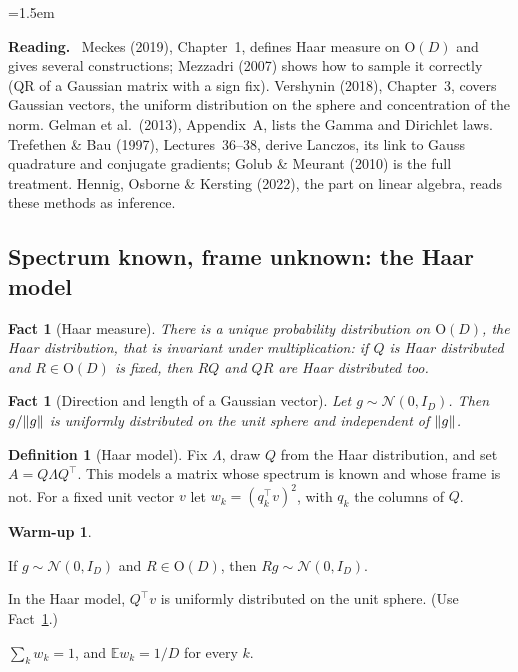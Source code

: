 \documentclass[11pt,a4paper]{article}
\newcommand{\E}{\mathbb{E}}
\newcommand{\Orth}{\mathrm{O}}
\DeclarePairedDelimiter{\norm}{\lVert}{\rVert}
\theoremstyle{plain}
\newtheorem{fact}[proposition]{Fact}
\theoremstyle{definition}
\newtheorem{definition}[proposition]{Definition}
\newtheorem{warmup}[proposition]{Warm-up}
\theoremstyle{remark}
\newenvironment{reading}{\begin{list}{}{\leftmargin=1.5em\rightmargin=0pt\topsep=6pt}\small\item[]%
  \textcolor{blue!50!black}{\textbf{Reading.}}\ }{\end{list}}
\begin{document}
\begin{reading}
Meckes (2019), Chapter~1, defines Haar measure on $\Orth(D)$ and gives several constructions; Mezzadri (2007) shows
how to sample it correctly (QR of a Gaussian matrix with a sign fix). Vershynin (2018), Chapter~3, covers Gaussian
vectors, the uniform distribution on the sphere and concentration of the norm. Gelman et al.\ (2013), Appendix~A,
lists the Gamma and Dirichlet laws. Trefethen \& Bau (1997), Lectures~36--38, derive Lanczos, its link to Gauss
quadrature and conjugate gradients; Golub \& Meurant (2010) is the full treatment. Hennig, Osborne \& Kersting
(2022), the part on linear algebra, reads these methods as inference.
\end{reading}

\subsection{Spectrum known, frame unknown: the Haar model}

\begin{fact}[Haar measure]\label{fact:haar}
There is a unique probability distribution on $\Orth(D)$, the \emph{Haar} distribution, that is invariant under
multiplication: if $Q$ is Haar distributed and $R\in\Orth(D)$ is fixed, then $RQ$ and $QR$ are Haar distributed too.
\end{fact}

\begin{fact}[Direction and length of a Gaussian vector]\label{fact:gauss}
Let $g\sim\mathcal{N}(0,I_D)$. Then $g/\norm{g}$ is uniformly distributed on the unit sphere and independent of
$\norm{g}$.
\end{fact}

\begin{definition}[Haar model]\label{def:haar}
Fix $\Lambda$, draw $Q$ from the Haar distribution, and set $A=Q\Lambda Q^\top$. This models a matrix whose spectrum
is known and whose frame is not. For a fixed unit vector $v$ let $w_k=(q_k^\top v)^2$, with $q_k$ the columns of $Q$.
\end{definition}

\begin{warmup}\label{wu:haar}
\begin{steps}
\item If $g\sim\mathcal{N}(0,I_D)$ and $R\in\Orth(D)$, then $Rg\sim\mathcal{N}(0,I_D)$.
\item In the Haar model, $Q^\top v$ is uniformly distributed on the unit sphere. (Use Fact~\ref{fact:haar}.)
\item $\sum_kw_k=1$, and $\E w_k=1/D$ for every $k$.
\end{steps}
\end{warmup}
\end{document}
